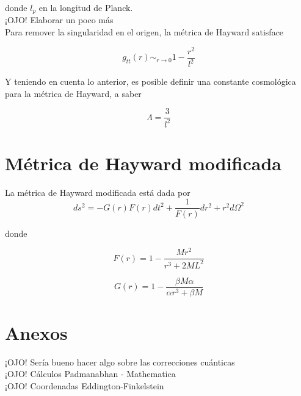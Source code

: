 \documentclass[prb,aps,preprintnumbers,amsmath,amssymb]{article}
\numberwithin{equation}{section}
\begin{document}
donde $l_{p}$ en la longitud de Planck.\\

¡OJO! Elaborar un poco más\\

Para remover la singularidad en el origen, la métrica de Hayward satisface 

\begin{equation}
g_{tt}(r) \sim_{r \to 0} 1 - \frac{r^2}{l^2}
\end{equation}

Y teniendo en cuenta lo anterior, es posible definir una constante cosmológica para la métrica de Hayward, a saber

\begin{equation}
\Lambda = \frac{3}{l^2}
\end{equation}

\section{Métrica de Hayward modificada}

La métrica de Hayward modificada está dada por 
\begin{equation}
\label{reg-sch}
ds^2 = -G(r)F(r) dt^2 + \frac{1}{F(r)} dr^2 + r^2d\Omega ^2
\end{equation}

donde

\begin{equation}
\label{mod-hay-f}
F(r) = 1 - \frac{Mr^2}{r^3 + 2ML^2}
\end{equation}

\begin{equation}
\label{mod-hay-g}
G(r) = 1 - \frac{\beta M \alpha}{\alpha r^3 + \beta M}
\end{equation}

\section{Anexos}

¡OJO! Sería bueno hacer algo sobre las correcciones cuánticas\\

¡OJO! Cálculos Padmanabhan - Mathematica\\

¡OJO! Coordenadas Eddington-Finkelstein\\
\end{document}
